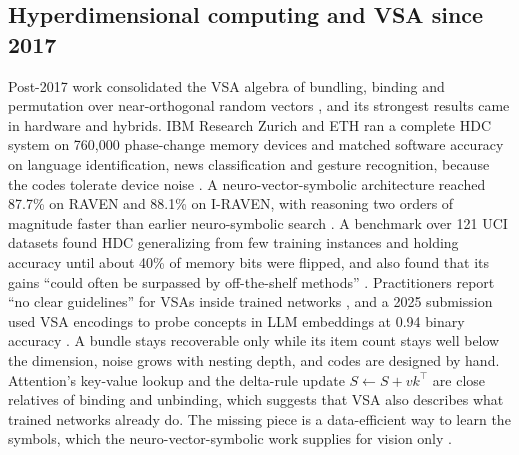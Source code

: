 \subsection{Hyperdimensional computing and VSA since 2017}
Post-2017 work consolidated the VSA algebra of bundling, binding and permutation over near-orthogonal random vectors \cite{post75}, and its strongest results came in hardware and hybrids. IBM Research Zurich and ETH ran a complete HDC system on 760,000 phase-change memory devices and matched software accuracy on language identification, news classification and gesture recognition, because the codes tolerate device noise \cite{post76}. A neuro-vector-symbolic architecture reached 87.7\% on RAVEN and 88.1\% on I-RAVEN, with reasoning two orders of magnitude faster than earlier neuro-symbolic search \cite{post77}. A benchmark over 121 UCI datasets found HDC generalizing from few training instances and holding accuracy until about 40\% of memory bits were flipped, and also found that its gains ``could often be surpassed by off-the-shelf methods'' \cite{post78}. Practitioners report ``no clear guidelines'' for VSAs inside trained networks \cite{post79}, and a 2025 submission used VSA encodings to probe concepts in LLM embeddings at 0.94 binary accuracy \cite{post80}. A bundle stays recoverable only while its item count stays well below the dimension, noise grows with nesting depth, and codes are designed by hand. Attention's key-value lookup and the delta-rule update $S \leftarrow S + v k^\top$ are close relatives of binding and unbinding, which suggests that VSA also describes what trained networks already do. The missing piece is a data-efficient way to learn the symbols, which the neuro-vector-symbolic work supplies for vision only \cite{post77}.

